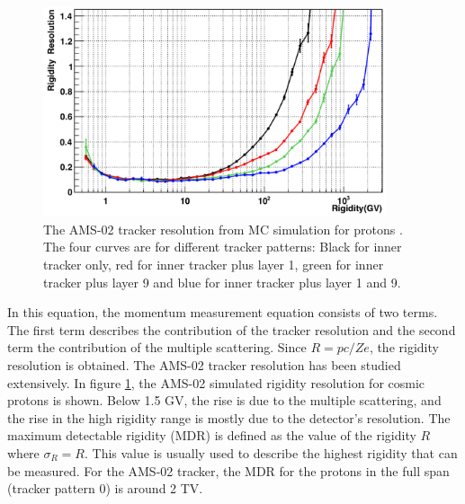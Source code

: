 \begin{figure}[htpb]
\centering
\includegraphics[width=0.9\textwidth, height=0.4\textheight ]{Figures/chapter3/Tracker/RigidityResolutionProton.png}
\caption[Tracker resolution from MC simulation for protons.]{The AMS-02 tracker resolution from MC simulation for protons \cite{ChargeConfusionReasonsAndTrackerResolutionPaper}. The four curves are for different tracker patterns: Black for inner tracker only, red for inner tracker plus layer 1, green for inner tracker plus layer 9 and blue for inner tracker plus layer 1 and 9. } 
\label{TrackerResolutions}
\end{figure}

In this equation, the momentum measurement equation consists of two terms. The first term describes the contribution of the tracker resolution and the second term the contribution of the multiple scattering. Since $R=pc/Ze$, the rigidity resolution is obtained. The AMS-02 tracker resolution has been studied extensively. In figure \ref{TrackerResolutions}, the AMS-02 simulated rigidity resolution for cosmic protons is shown. Below 1.5 GV, the rise is due to the multiple scattering, and the rise in the high rigidity range is mostly due to the detector’s resolution. The maximum detectable rigidity (MDR) is defined as the value of the rigidity $R$ where $\sigma_{R}=R$. This value is usually used to describe the highest rigidity that can be measured. For the AMS-02 tracker, the MDR for the protons in the full span (tracker pattern 0) is around 2 TV.





